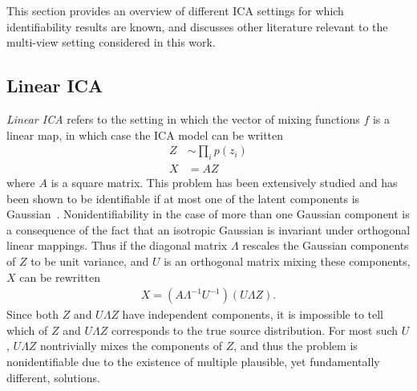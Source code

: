 This section provides an overview of different ICA settings for which identifiability results are known, and discusses other literature relevant to the multi-view setting considered in this work.





\subsection{Linear ICA}\label{subsec:ica-literature-linear-ica}


\emph{Linear ICA} refers to the setting in which the vector of mixing functions $f$ is a linear map, 
in which case the ICA model can be written
%
\begin{align*}
Z &\sim \prod_i p(z_i) \\
X &= AZ
\end{align*}
%
where $A$ is a square matrix.
This problem has been extensively studied and has been shown to be identifiable if at most one of the latent components is Gaussian~\citep{darmois1953analyse, skitovich1954linear, comon1994independent}.
Nonidentifiability in the case of more than one Gaussian component is a consequence of the fact that an isotropic Gaussian is invariant under orthogonal linear mappings.
Thus if the diagonal matrix $\Lambda$ rescales the Gaussian components of $Z$ to be unit variance, and $U$ is an orthogonal matrix mixing these components, $X$ can be rewritten
%
\begin{align*}
X = \left(A\Lambda^{-1}U^{-1} \right) \left(U\Lambda Z\right).
\end{align*}
%
Since both $Z$ and $U\Lambda Z$ have independent components, it is impossible to tell which of $Z$ and ${U}{\Lambda} Z$ corresponds to the true source distribution.
For most such $U$, $U\Lambda Z$ nontrivially mixes the components of $Z$, and thus the problem is nonidentifiable due to the existence of multiple plausible, yet fundamentally different, solutions.

